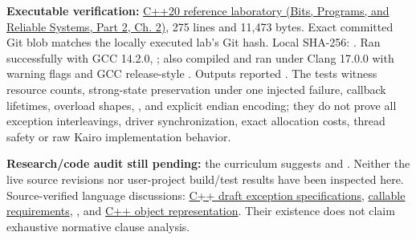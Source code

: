 \textbf{Executable verification:} \href{../01-Bits-Programs-and-Reliable-Systems-P02/main.pdf\#nameddest=source-file-32e93bc026677e074aaa7771}{C++20 reference laboratory (Bits, Programs, and Reliable Systems, Part 2, Ch. 2)}, 275 lines and 11,473 bytes. Exact committed Git blob  matches the locally executed lab's Git hash. Local SHA-256: . Ran successfully with GCC 14.2.0, ; also compiled and ran under Clang 17.0.0 with warning flags and GCC release-style . Outputs reported . The tests witness resource counts, strong-state preservation under one injected failure, callback lifetimes, overload shapes, , and explicit endian encoding; they do not prove all exception interleavings, driver synchronization, exact allocation costs, thread safety or raw Kairo implementation behavior.

\textbf{Research/code audit still pending:} the curriculum suggests  and . Neither the live source revisions nor user-project build/test results have been inspected here. Source-verified language discussions: \href{https://eel.is/c++draft/except.spec}{C++ draft exception specifications}, \href{https://en.cppreference.com/w/cpp/utility/functional/function}{ callable requirements}, \href{https://en.cppreference.com/w/cpp/numeric/bit_cast}{}, and \href{https://en.cppreference.com/w/cpp/language/object}{C++ object representation}. Their existence does not claim exhaustive normative clause analysis.

